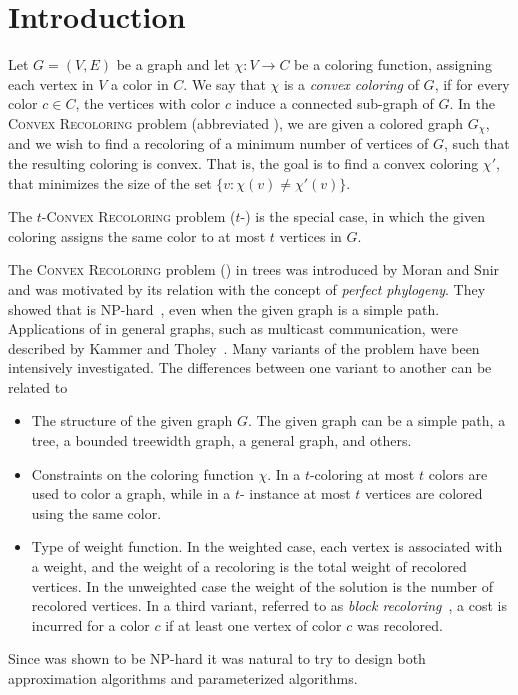 \section{Introduction}

Let $G = (V, E)$ be a graph and let $\chi : V \rightarrow C$ be a coloring function, 
assigning each vertex in $V$ a color in $C$.  
We say that $\chi$ is a \emph{convex coloring} of $G$, 
if for every color $c \in C$, 
the vertices with color $c$ induce a connected sub-graph of $G$.
%
In the \textsc{Convex Recoloring} problem (abbreviated \CRP{}), 
we are given a colored graph $G_\chi$,
and we wish to find a recoloring of a minimum number of vertices of $G$,
such that the resulting coloring is convex. 
That is,
the goal is to find a convex coloring $\chi'$,
that minimizes the size of the set $\{v : \chi(v) \neq \chi'(v)\}$.

The \textsc{$t$-Convex Recoloring} problem ($t$-\CRP{}) is the special case,
in which the given coloring assigns the same color to at most $t$ vertices in $G$.

The \textsc{Convex Recoloring} problem (\CRP{}) in trees was introduced 
by Moran and Snir~\cite{MoranSnir08} and was motivated by its relation
with the concept of \emph{perfect phylogeny}.
%
They showed that \TWOCR{} is NP-hard~\cite{MoranSnir08}, 
even when the given graph is a simple path.
%
Applications of \CRP{} in general graphs, 
such as multicast communication, 
were described by Kammer and Tholey~\cite{kammer2012complexity}.
%
Many variants of the problem have been intensively investigated.
%
The differences between one variant to another can be related to
%
\begin{itemize}
\item The structure of the given graph $G$.
%
The given graph can be a simple path, 
a tree,
a bounded treewidth graph, 
a general graph, 
and others.
  
\item Constraints on the coloring function $\chi$.
%
In a $t$-coloring at most $t$ colors are used to color a graph,
while in a $t$-\CRP{} instance at most $t$ vertices are colored using the same color.

\item Type of weight function.
%
In the weighted case, 
each vertex is associated with a weight,
and the weight of a recoloring is the total weight of recolored vertices.
%
In the unweighted case the weight of the solution is the number of recolored vertices.
%
In a third variant, 
referred to as \emph{block recoloring}~\cite{kammer2012complexity}, 
a cost is incurred for a color $c$ if at least one vertex of color $c$ was recolored. 
\end{itemize}
%
Since \CRP{} was shown to be NP-hard it was natural to try to design both
approximation algorithms and parameterized algorithms.

